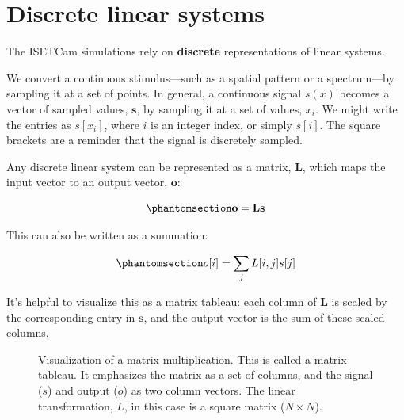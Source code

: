 \documentclass[
  letterpaper,
]{book}
\begin{document}
\section{Discrete linear systems}\label{sec-ls-discrete}

The ISETCam simulations rely on \textbf{discrete} representations of
linear systems.

We convert a continuous stimulus---such as a spatial pattern or a
spectrum---by sampling it at a set of points. In general, a continuous
signal \(s(x)\) becomes a vector of sampled values, \(\mathbf{s}\), by
sampling it at a set of values, \(x_i\). We might write the entries as
\(s[x_i]\), where \(i\) is an integer index, or simply \(s[i]\). The
square brackets are a reminder that the signal is discretely sampled.

Any discrete linear system can be represented as a matrix,
\(\mathbf{L}\), which maps the input vector to an output vector,
\(\mathbf{o}\):

\begin{equation}\phantomsection\label{eq-linear-matrix}{
\mathbf{o} = \mathbf{L} \mathbf{s}
}\end{equation}

This can also be written as a summation:

\begin{equation}\phantomsection\label{eq-linear-matrix-summation}{
o[i] = \sum_j L[i,j] s[j] 
}\end{equation}

It's helpful to visualize this as a matrix tableau: each column of
\(\mathbf{L}\) is scaled by the corresponding entry in \(\mathbf{s}\),
and the output vector is the sum of these scaled columns.

\begin{figure}


\caption{\label{fig-ls-matrix-tableau}Visualization of a matrix
multiplication. This is called a matrix tableau. It emphasizes the
matrix as a set of columns, and the signal (\(s\)) and output (\(o\)) as
two column vectors. The linear transformation, \(L\), in this case is a
square matrix (\(N \times N\)).}

\end{figure}%
\end{document}
